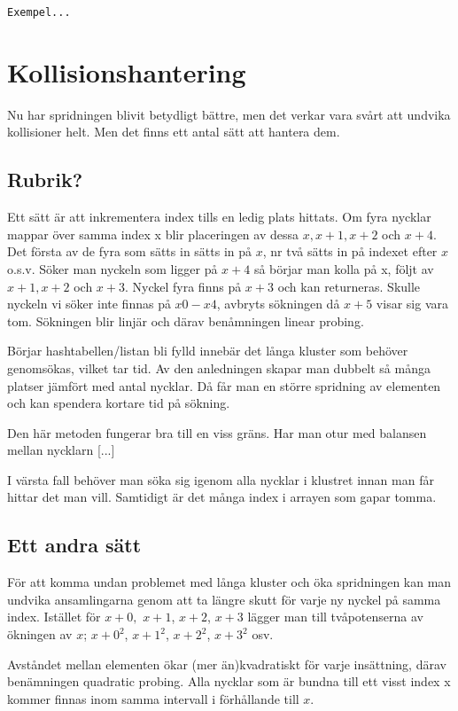 \documentclass[a5paper,10pt,oneside]{article}
\begin{document}
\texttt{Exempel...}



\section*{Kollisionshantering}
Nu har spridningen blivit betydligt bättre, men det verkar vara svårt att undvika kollisioner helt. Men det finns ett antal sätt att hantera dem.

\subsection*{Rubrik?}
Ett sätt är att inkrementera index tills en ledig plats hittats.
Om fyra nycklar mappar över samma index x blir placeringen av dessa $x, x+1, x+2$ och $x+4$. Det första av de fyra som sätts in sätts in på $x$, nr två sätts in på indexet efter $x$ o.s.v. 
Söker man nyckeln som ligger på $x + 4$ så börjar man kolla på x, följt av $x + 1, x + 2$ och $x+3$. Nyckel fyra finns på $x + 3$ och kan returneras. Skulle nyckeln vi söker inte finnas på $x0 - x4$, avbryts sökningen då $x + 5$ visar sig vara tom. Sökningen blir linjär och därav benåmningen linear probing.

 Börjar hashtabellen/listan bli fylld innebär det långa kluster som behöver genomsökas, vilket tar tid. Av den anledningen skapar man dubbelt så många platser jämfört med antal nycklar. Då får man en större spridning av elementen och kan spendera kortare tid på sökning.

Den här metoden fungerar bra till en viss gräns. Har man otur med balansen mellan nycklarn [...]


 I värsta fall behöver man söka sig igenom alla nycklar i klustret innan man får hittar det man vill. Samtidigt är det många index i arrayen som gapar tomma. 


\subsection*{Ett andra sätt}
För att komma undan problemet med långa kluster och öka spridningen kan man undvika ansamlingarna genom att ta längre skutt för varje ny nyckel på samma index.
Istället för $ x + 0,$  $x + 1$, $x + 2$, $x + 3$ lägger man till tvåpotenserna av ökningen av $x$;
$ x + {0}^{2} $, $ x + {1}^{2} $, $ x + {2}^{2} $, $ x + {3}^{2} $ osv.

Avståndet mellan elementen ökar (mer än)kvadratiskt för varje insättning, därav benämningen quadratic probing. Alla nycklar som är bundna till ett visst index x kommer finnas inom samma intervall i förhållande till $x$.
\end{document}
